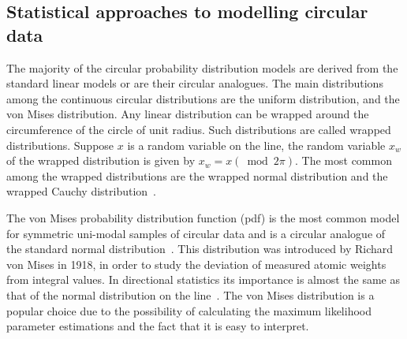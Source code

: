 \documentclass[10pt,journal,cspaper,compsoc]{IEEEtran}
\begin{document}
\subsection{Statistical approaches to modelling circular data}
The majority of the circular probability distribution models are derived from the standard linear models or are their circular analogues. The main distributions among the continuous circular distributions are the uniform distribution, and the von Mises distribution. Any linear distribution can be wrapped around the circumference of the circle of unit radius. Such distributions are called wrapped distributions. Suppose $x$ is a random variable on the line, the random variable $x_{w}$ of the wrapped distribution is given by $x_{w} =x(\bmod{2\pi})$. The most common among the wrapped distributions are the wrapped normal distribution and the wrapped Cauchy distribution~\cite{fisher1995statistical, jammalamadaka2001topics, mardia1972statistics}.

%

The von Mises probability distribution function (pdf) is the most common model for symmetric uni-modal samples of circular data and is a circular analogue of the standard normal distribution~\cite{mardia1972statistics}. This distribution was introduced by Richard von Mises in 1918, in order to study the deviation of measured atomic weights from integral values. In directional statistics its  importance is almost the same as that of the normal distribution on the line~\cite{fisher1995statistical, jammalamadaka2001topics, mardia1972statistics}. The von Mises distribution is a popular choice due to the possibility of calculating the maximum likelihood parameter estimations and the fact that it is easy to interpret. 
\end{document}
